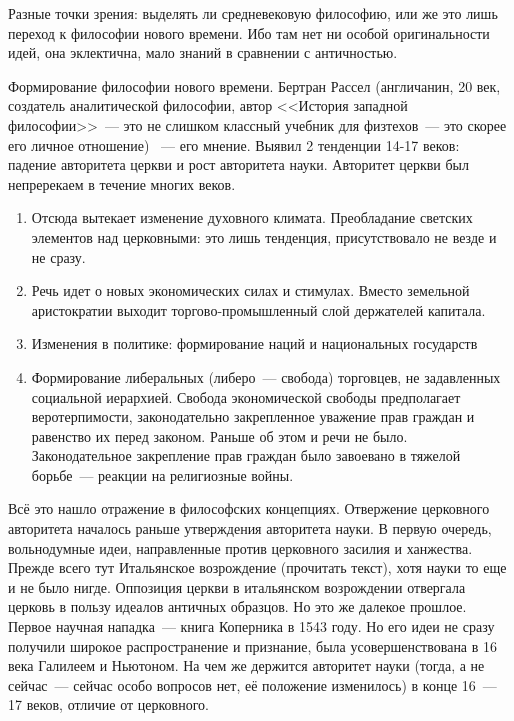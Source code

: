 Разные точки зрения: выделять ли средневековую философию, или же это лишь переход к философии нового времени. Ибо там нет ни особой оригинальности идей, она эклектична, мало знаний в сравнении с античностью.

Формирование философии нового времени.
Бертран Рассел (англичанин, 20 век, создатель аналитической философии, автор <<История западной философии>>~--- это не слишком классный учебник для физтехов~--- это скорее его личное отношение) ~--- его мнение.
Выявил 2 тенденции 14-17 веков: падение авторитета церкви и рост авторитета науки. Авторитет церкви был непререкаем в течение многих веков. 

\begin{enumerate}
	\item Отсюда вытекает изменение духовного климата. Преобладание светских элементов над церковными: это лишь тенденция, присутствовало не везде и не сразу. 
	\item Речь идет о новых экономических силах и стимулах. Вместо земельной аристократии выходит торгово-промышленный слой держателей капитала.
	\item Изменения в политике: формирование наций и национальных государств
	\item Формирование либеральных (либеро~--- свобода) торговцев, не задавленных социальной иерархией. Свобода экономической свободы предполагает веротерпимости, законодательно закрепленное уважение прав граждан и равенство их перед законом. Раньше об этом и речи не было. Законодательное закрепление прав граждан было завоевано в тяжелой борьбе~--- реакции на религиозные войны.
\end{enumerate}
Всё это нашло отражение в философских концепциях. Отвержение церковного авторитета началось раньше утверждения авторитета науки. В первую очередь, вольнодумные идеи, направленные против церковного засилия и ханжества. Прежде всего тут Итальянское возрождение (прочитать текст), хотя науки то еще и не было нигде. Оппозиция церкви в итальянском возрождении отвергала церковь в пользу идеалов античных образцов. Но это же далекое прошлое. Первое научная нападка~--- книга Коперника в 1543 году. Но его идеи не сразу получили широкое распространение и признание, была усовершенствована в 16 века Галилеем и Ньютоном. 
На чем же держится авторитет науки (тогда, а не сейчас~--- сейчас особо вопросов нет, её положение изменилось) в конце 16~--- 17 веков, отличие от церковного.

